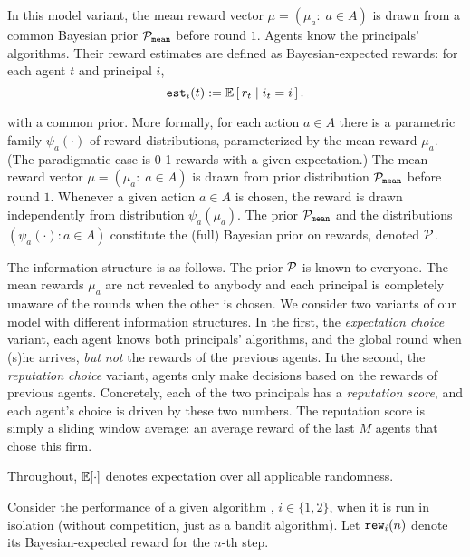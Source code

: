 
In this model variant, the mean reward vector $\mu = (\mu_a:\; a\in A)$ is drawn from a common Bayesian prior $\mathcal{P}_\mathtt{mean}$ before round $1$. Agents know the principals' algorithms. Their reward estimates are defined as Bayesian-expected rewards: for each agent $t$ and principal $i$,
\[ \est_i(t) := \E\sbr{ r_t\mid i_t = i }.\]



with a common prior. More formally, for each action $a\in A$ there is a parametric family $\psi_a(\cdot)$ of
reward distributions, parameterized by the mean reward $\mu_a$. (The paradigmatic case is 0-1 rewards with a given expectation.) The
mean reward vector $\mu = (\mu_a:\; a\in A)$ is drawn from prior distribution $\mathcal{P}_\mathtt{mean}$ before round $1$. Whenever a given action $a\in A$ is chosen, the reward is drawn independently from distribution $\psi_a(\mu_a)$. The prior $\mathcal{P}_\mathtt{mean}$ and the distributions $(\psi_a(\cdot)\colon a\in A)$ constitute the (full) Bayesian prior on rewards, denoted $\mathcal{P}$.



The information structure is as follows. The prior $\mathcal{P}$ is known to everyone. The mean rewards $\mu_a$ are not revealed to anybody and each principal is completely unaware of the rounds when the other is chosen. We consider two variants of our model with different information structures. In the first, the  \textit{expectation choice} variant, each agent knows both principals' algorithms, and the global round when (s)he arrives, \emph{but not} the rewards of the previous agents. In the second, the \textit{reputation choice} variant, agents only make decisions based on the rewards of previous agents. Concretely, each of the two principals has a \emph{reputation score}, and each agent's choice is driven by these two numbers. The reputation score is simply a sliding window average: an average reward of the last $M$ agents that chose this firm.



Throughout, $\E[\cdot]$ denotes expectation over all applicable randomness.

Consider the performance of a given algorithm \alg[i], $i\in \{1,2\}$, when it is run in isolation (\ie without competition, just as a bandit algorithm). Let $\mathtt{rew}_i(n)$ denote its Bayesian-expected reward for the $n$-th step.

